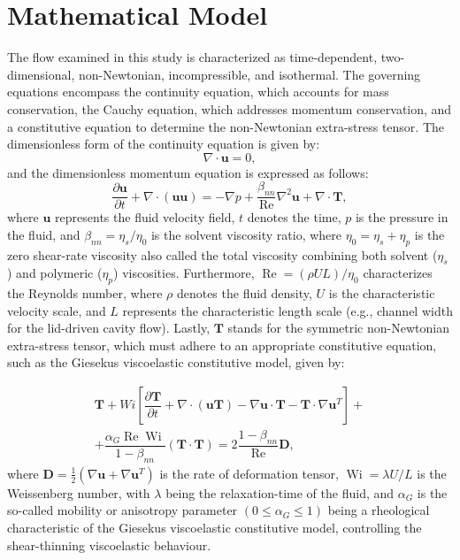 \documentclass[preprint, 12pt]{elsarticle}
\begin{document}
\section{Mathematical Model}\label{sec_MathematicalModel}
\unskip
The flow examined in this study is characterized as time-dependent, two-dimensional, non-Newtonian, incompressible, and isothermal. The governing equations encompass the continuity equation, which accounts for mass conservation, the Cauchy equation, which addresses momentum conservation, and a constitutive equation to determine the non-Newtonian extra-stress tensor. The dimensionless form of the continuity equation is given by:
\begin{equation}
    \nabla\cdot\mathbf{u} = 0,\label{eq_conservation}
\end{equation}
and the dimensionless momentum equation is expressed as follows:
\begin{equation}
    \dfrac{\partial\mathbf{u}}{\partial t} + \nabla\cdot(\mathbf{uu}) = -\nabla p + \dfrac{\beta_{nn}}{\operatorname{Re}}\nabla^{2}\mathbf{u} + \nabla\cdot\mathbf{T},\label{eq_momentun}
\end{equation}
where $\mathbf{u}$ represents the fluid velocity field, $t$ denotes the time, $p$ is the pressure in the fluid, and $\beta_{nn} = \eta_{s}/\eta_{0}$ is the solvent viscosity ratio, where $\eta_{0} = \eta_{s} + \eta_{p}$ is the zero shear-rate viscosity also called the total viscosity combining both solvent ($\eta_{s}$) and polymeric ($\eta_{p}$) viscosities. Furthermore, $\operatorname{Re} = (\rho U L)/\eta_{0}$ characterizes the Reynolds number, where $\rho$ denotes the fluid density, $U$ is the characteristic velocity scale, and $L$ represents the characteristic length scale (e.g., channel width for the lid-driven cavity flow). Lastly, $\mathbf{T}$ stands for the symmetric non-Newtonian extra-stress tensor, which must adhere to an appropriate constitutive equation, such as the Giesekus viscoelastic constitutive model, given by:

\begin{align}
    \mathbf{T} + Wi\left[ \dfrac{\partial\mathbf{T}}{\partial t} + \nabla\cdot(\mathbf{uT}) - \nabla\mathbf{u}\cdot\mathbf{T} - \mathbf{T}\cdot\nabla\mathbf{u}^{T} \right] 
    + \nonumber\\ + \dfrac{\alpha_{G}\operatorname{Re}\operatorname{Wi}}{1-\beta_{nn}}\left( \mathbf{T}\cdot\mathbf{T} \right) = 2\dfrac{1-\beta_{nn}}{\operatorname{Re}}\mathbf{D},\label{eq_geral_tensors}
\end{align}
where $\mathbf{D} = \frac{1}{2}\left( \nabla\mathbf{u} + \nabla\mathbf{u}^{T}  \right)$ is the rate of deformation tensor, $\operatorname{Wi} = \lambda U / L$ is the Weissenberg number, with $\lambda$ being the relaxation-time of the fluid, and $\alpha_{G}$ is the so-called mobility or anisotropy parameter $(0\leq \alpha_{G}\leq 1)$ being a rheological characteristic of the Giesekus viscoelastic constitutive model, controlling the shear-thinning viscoelastic behaviour.
\end{document}
